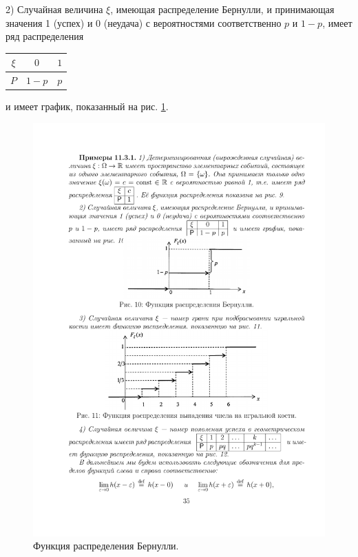 2) Случайная величина $\xi$, имеющая распределение Бернулли, и принимающая значения 1 (успех) и 0 (неудача) с вероятностями соответственно
$p$ и $1 − p$, имеет ряд распределения 
\begin{tabular}{|c|c|c|}
\hline
$\xi$ & $0$ & $1$\\ \hline
$P$   & $1-p$ & $p$\\ \hline
\end{tabular}
 и имеет график, показанный на рис. \ref{fig10}.



\begin{figure}[h!]
	\centering
	\includegraphics[]{pic/pic10}
	\caption{Функция распределения Бернулли.}
	\label{fig10}
\end{figure}

